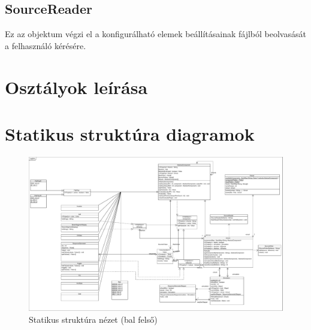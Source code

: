 \subsection{\bf SourceReader}
Ez az objektum végzi el a konfigurálható elemek beállításainak fájlból beolvasását a felhasználó kérésére.

\section{Osztályok leírása}






\section{Statikus struktúra diagramok}

\begin{figure}[H]
\begin{center}
\includegraphics*[angle=90, width=13cm, viewport = 0 475 765 930]{chapters/chapter03/classdiagram/class_diagram.pdf}
\caption{Statikus struktúra nézet (bal felső)}
\label{fig:class_diagram}
\end{center}
\end{figure}


